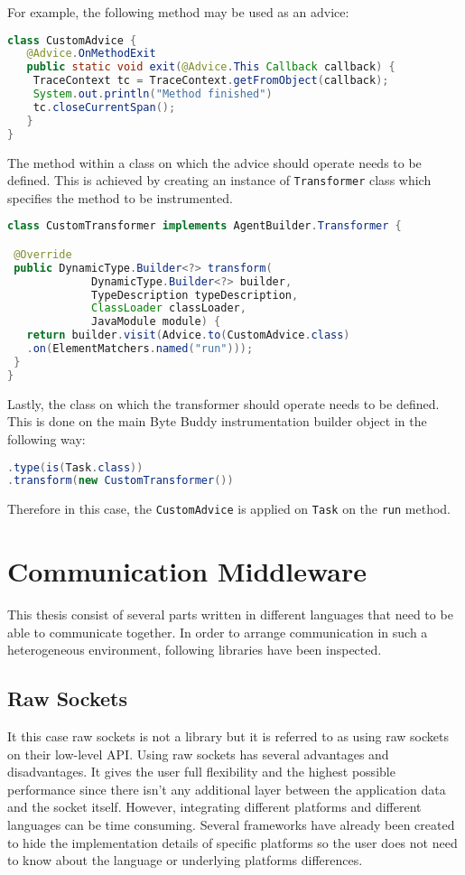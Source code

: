 For example, the following method may be used as an advice: 
\begin{lstlisting}[language=Java]
class CustomAdvice {
   @Advice.OnMethodExit
   public static void exit(@Advice.This Callback callback) {
   	TraceContext tc = TraceContext.getFromObject(callback);
   	System.out.println("Method finished")
   	tc.closeCurrentSpan();
   }
}   
\end{lstlisting}

The method within a class on which the advice should operate needs to be defined. This is achieved by creating an instance of \texttt{Transformer} class which specifies the method to be instrumented.

\begin{lstlisting}[language=Java]
class CustomTransformer implements AgentBuilder.Transformer {

 @Override
 public DynamicType.Builder<?> transform(
			 DynamicType.Builder<?> builder,
			 TypeDescription typeDescription,
			 ClassLoader classLoader,
			 JavaModule module) {
   return builder.visit(Advice.to(CustomAdvice.class)
   .on(ElementMatchers.named("run")));
 }
}
\end{lstlisting}

Lastly, the class on which the transformer should operate needs to be defined. This is done on the main Byte Buddy instrumentation builder object in the following way:

\begin{lstlisting}[language=Java]
.type(is(Task.class))
.transform(new CustomTransformer())
\end{lstlisting}

Therefore in this case, the \texttt{CustomAdvice} is applied on \texttt{Task} on the \texttt{run} method.
\section{Communication Middleware}
This thesis consist of several parts written in different languages that need to be able to communicate together. In order to arrange communication in such a heterogeneous environment, following libraries have been inspected.
\subsection{Raw Sockets}
\label{raw_sockets}
It this case raw sockets is not a library but it is referred to as using raw sockets on their low-level API. Using raw sockets has several advantages and disadvantages. It gives the user full flexibility and the highest possible performance since there isn't any additional layer between the application data and the socket itself. However, integrating different platforms and different languages can be time consuming. Several frameworks have already been created to hide the implementation details of specific platforms so the user does not need to know about the language or underlying platforms differences.
